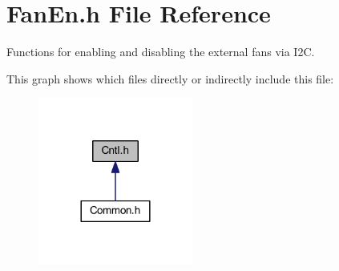 \hypertarget{a00015}{\section{Fan\-En.\-h File Reference}
\label{a00015}
}


Functions for enabling and disabling the external fans via I2\-C.  


This graph shows which files directly or indirectly include this file\-:\nopagebreak
\begin{figure}[H]
\begin{center}
\leavevmode
\includegraphics[width=144pt]{a00046}
\end{center}
\end{figure}
